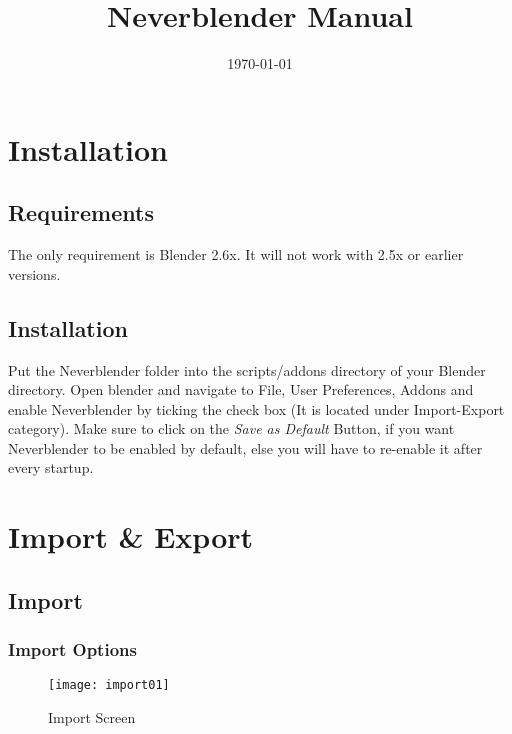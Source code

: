 \documentclass[a4paper]{article}
\begin{document}
\title{Neverblender Manual}

\date{\today}

\maketitle
\tableofcontents

\section{Installation}

\subsection{Requirements}
The only requirement is Blender 2.6x. It will not work with 2.5x or earlier versions.

\subsection{Installation}
Put the Neverblender folder into the scripts/addons directory of your Blender directory. Open blender and navigate to File, User Preferences, Addons and enable Neverblender by ticking the check box (It is located under Import-Export category). Make sure to click on the {\itshape{Save as Default}} Button, if you want Neverblender to be enabled by default, else you will have to re-enable it after every startup.


\section{Import \& Export}

\subsection{Import}

\subsubsection*{Import Options}

\begin{figure}
  \centering
  \texttt{[image: import01]}
  \caption[mdl import]{Import Screen}
  \label{fig:import01}
\end{figure}
\end{document}
